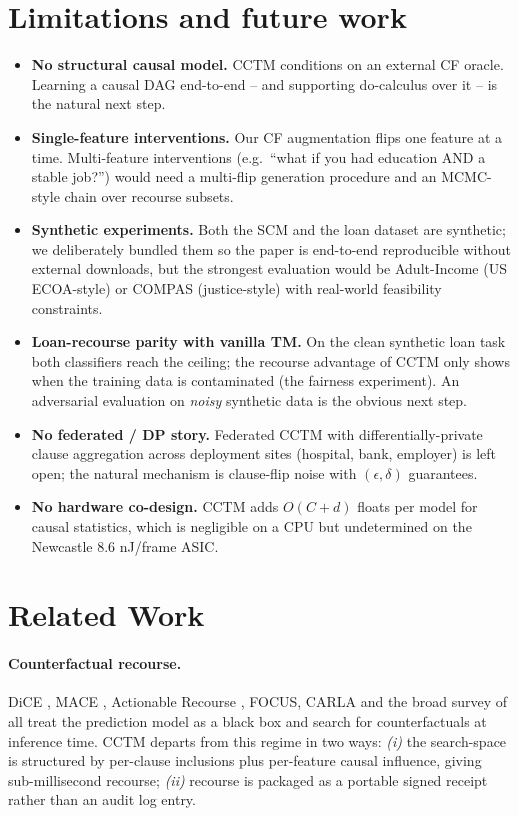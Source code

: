 \documentclass[11pt]{article}
\begin{document}
\section{Limitations and future work}
\label{sec:limits}

\begin{itemize}[leftmargin=2em]
\item \textbf{No structural causal model.}  CCTM conditions on an external CF oracle.  Learning a causal DAG end-to-end -- and supporting do-calculus over it -- is the natural next step.
\item \textbf{Single-feature interventions.}  Our CF augmentation flips one feature at a time.  Multi-feature interventions (e.g.\ ``what if you had education AND a stable job?'') would need a multi-flip generation procedure and an MCMC-style chain over recourse subsets.
\item \textbf{Synthetic experiments.}  Both the SCM and the loan dataset are synthetic; we deliberately bundled them so the paper is end-to-end reproducible without external downloads, but the strongest evaluation would be Adult-Income (US ECOA-style) or COMPAS (justice-style) with real-world feasibility constraints.
\item \textbf{Loan-recourse parity with vanilla TM.}  On the clean synthetic loan task both classifiers reach the ceiling; the recourse advantage of CCTM only shows when the training data is contaminated (the fairness experiment).  An adversarial evaluation on \emph{noisy} synthetic data is the obvious next step.
\item \textbf{No federated / DP story.}  Federated CCTM with differentially-private clause aggregation across deployment sites (hospital, bank, employer) is left open; the natural mechanism is clause-flip noise with $(\epsilon, \delta)$ guarantees.
\item \textbf{No hardware co-design.}  CCTM adds $O(C + d)$ floats per model for causal statistics, which is negligible on a CPU but undetermined on the Newcastle 8.6 nJ/frame ASIC.
\end{itemize}

\section{Related Work}

\paragraph{Counterfactual recourse.}  DiCE \citep{mothilal2020dice}, MACE \citep{karimi2020mace}, Actionable Recourse \citep{ustun2019actionable}, FOCUS, CARLA \citep{pawelczyk2021carla} and the broad survey of \citet{verma2020counterfactual} all treat the prediction model as a black box and search for counterfactuals at inference time.  CCTM departs from this regime in two ways: \emph{(i)} the search-space is structured by per-clause inclusions plus per-feature causal influence, giving sub-millisecond recourse; \emph{(ii)} recourse is packaged as a portable signed receipt rather than an audit log entry.
\end{document}
